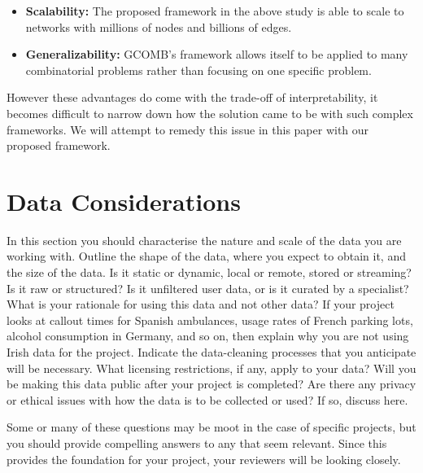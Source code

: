 \documentclass[]{UCD_CS_FYP_Report}
\begin{document}
\begin{itemize}
  \item \textbf{Scalability: }The proposed framework in the above study is able to scale to networks with millions of nodes and billions of edges.
  \item \textbf{Generalizability: }\textsc{GCOMB}'s framework allows itself to be applied to many combinatorial problems rather than focusing on one specific problem.
\end{itemize}
However these advantages do come with the trade-off of interpretability, it becomes difficult to narrow down how the solution came to be with such complex frameworks. We will attempt to remedy this issue in this paper with our proposed framework.\\[0.5cm]




\chapter{Data Considerations}
In this section you should characterise the nature and scale of the data you are working with. Outline the shape of the data, where you expect to obtain it, and the size of the data. Is it static or dynamic, local or remote, stored or streaming? Is it raw or structured? Is it unfiltered user data, or is it curated by a specialist? What is your rationale for using this data and not other data? If your project looks at callout times for Spanish ambulances, usage rates of French parking lots, alcohol consumption in Germany, and so on, then explain why you are not using Irish data for the project. Indicate the data-cleaning processes that you anticipate will be necessary. What licensing restrictions, if any, apply to your data? Will you be making this data public after your project is completed? Are there any privacy or ethical issues with how the data is to be collected or used? If so, discuss here.

Some or many of these questions may be moot in the case of specific projects, but you should provide compelling answers to any that seem relevant. Since this provides the foundation for your project, your reviewers will be looking closely.

\end{document}
